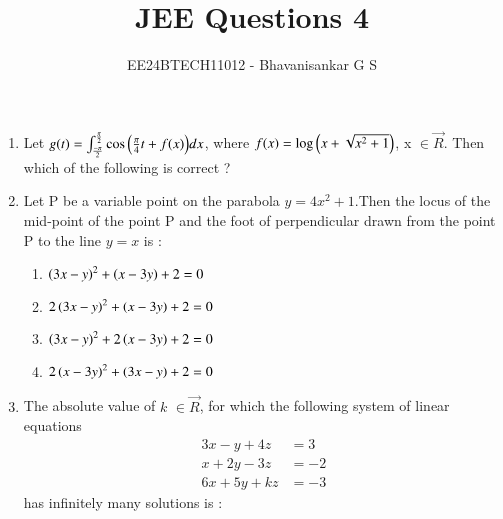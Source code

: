 \documentclass[journal,12pt,onecolumn]{IEEEtran}
\theoremstyle{remark}
\begin{document}

\vspace{3cm}

\title{JEE Questions 4}
\author{EE24BTECH11012 - Bhavanisankar G S}
\maketitle
\newpage
\bigskip

\renewcommand{\thefigure}{\theenumi}
\renewcommand{\thetable}{\theenumi}
\begin{enumerate}
	 	
 \item Let $ g(t) = \int_{\frac{- \pi}{2}}^{\frac{\pi}{2}} \cos{\ensuremath{\left(\frac{\pi}{4}t + f(x)\right)}} dx$, where $f(x) = \log{\ensuremath{\left(x + \sqrt{x^2 + 1}\right)}}$, x $\in \vec{R}$. Then which of the following is correct ?
	 \begin{enumerate}
	 \end{enumerate}
 \item Let P be a variable point on the parabola $y=4x^2+1$.Then the locus of the mid-point of the point P and the foot of perpendicular drawn from the point P to the line $y=x$ is :
	 \begin{enumerate}
		 \item $\left(3x-y\right)^2 + \left(x-3y\right) + 2 = 0$
		 \item $2 \left(3x-y\right)^2 + \left(x-3y\right) + 2 = 0$
		 \item $\left(3x-y\right)^2 + 2\left(x-3y\right) + 2 = 0$
		 \item $2 \left(x-3y\right)^2 + \left(3x-y\right) + 2 = 0$
	 \end{enumerate}
\item The absolute value of $k$ $ \in \vec{R}$, for which the following system of linear equations 
		\begin{align}
			3x - y + 4z &= 3 \\ 
			x + 2y - 3z &= -2 \\
			6x + 5y + kz &= -3 
		\end{align}
		has infinitely many solutions is :
	\begin{enumerate}
			\begin{multicols}{4}

\end{multicols}
\end{enumerate}
\end{enumerate}
\end{document}
